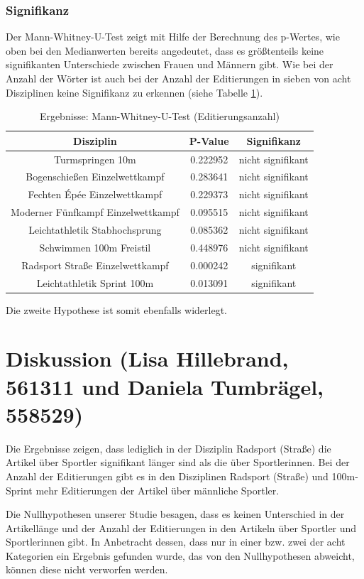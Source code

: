 \documentclass[11pt]{article}
\begin{document}
\subsubsection{Signifikanz}

Der Mann-Whitney-U-Test zeigt mit Hilfe der Berechnung des p-Wertes, wie oben bei den Medianwerten bereits angedeutet, dass es größtenteils keine signifikanten Unterschiede zwischen Frauen und Männern gibt. Wie bei der Anzahl der Wörter ist auch bei der Anzahl der Editierungen in sieben von acht Disziplinen keine Signifikanz zu erkennen (siehe Tabelle \ref{tab:utest_edit}).

\begin{table}
\caption{\label{tab:utest_edit}Ergebnisse: Mann-Whitney-U-Test (Editierungsanzahl)}
\centering
\begin{tabular}{ c|c|c }
  Disziplin & P-Value & Signifikanz \\
  \hline
  Turmspringen 10m & 0.222952 & nicht signifikant \\
  Bogenschießen Einzelwettkampf & 0.283641 & nicht signifikant \\
  Fechten Épée Einzelwettkampf & 0.229373 & nicht signifikant \\
  Moderner Fünfkampf Einzelwettkampf & 0.095515 & nicht signifikant \\
  Leichtathletik Stabhochsprung & 0.085362 & nicht signifikant \\
  Schwimmen 100m Freistil & 0.448976 & nicht signifikant \\
  Radsport Straße Einzelwettkampf & 0.000242 & signifikant \\
  Leichtathletik Sprint 100m & 0.013091 & signifikant \\
\end{tabular}
\end{table}

Die zweite Hypothese ist somit ebenfalls widerlegt.

\section{Diskussion (Lisa Hillebrand, 561311 und Daniela Tumbrägel, 558529)}
Die Ergebnisse zeigen, dass lediglich in der Disziplin Radsport (Straße) die Artikel über Sportler signifikant länger sind als die über Sportlerinnen. Bei der Anzahl der Editierungen gibt es in den Disziplinen Radsport (Straße) und 100m-Sprint mehr Editierungen der Artikel über männliche Sportler.

Die Nullhypothesen unserer Studie besagen, dass es keinen Unterschied in der Artikellänge und der Anzahl der Editierungen in den Artikeln über Sportler und Sportlerinnen gibt. In Anbetracht dessen, dass nur in einer bzw. zwei der acht Kategorien ein Ergebnis gefunden wurde, das von den Nullhypothesen abweicht, können diese nicht verworfen werden.
\end{document}
